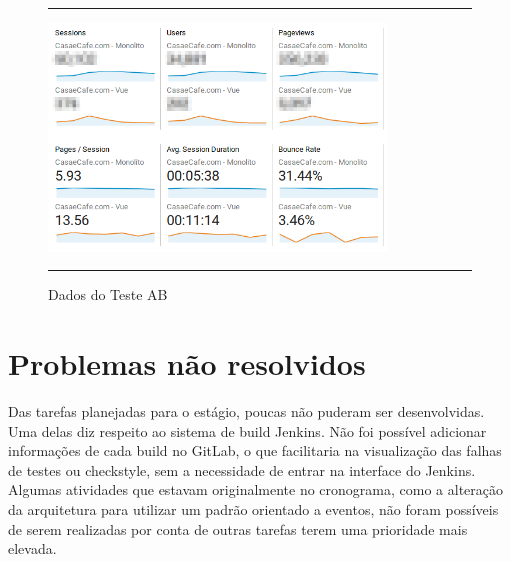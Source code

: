 \begin{figure}[h]
  \rule[1ex]{\textwidth}{0.25pt}
  \centering\includegraphics[width=0.80\textwidth]{img/analytics.png}
  \caption[Dados do Teste AB]
  {Dados do Teste AB}\label{fig:analytics}
  \rule[1ex]{\textwidth}{0.25pt}
\end{figure}

%
%
%

\section{Problemas não resolvidos}

Das tarefas planejadas para o estágio, poucas não puderam ser desenvolvidas. Uma delas diz respeito ao sistema de build \gls{Jenkins}. Não foi possível adicionar informações de cada build no GitLab, o que facilitaria na visualização das falhas de testes ou \gls{checkstyle}, sem a necessidade de entrar na interface do \gls{Jenkins}.\\

Algumas atividades que estavam originalmente no cronograma, como a alteração da arquitetura para utilizar um padrão orientado a eventos, não foram possíveis de serem realizadas por conta de outras tarefas terem uma prioridade mais elevada.\\
